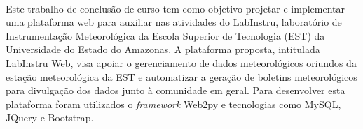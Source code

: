 \ \ \\[2cm]
Este trabalho de conclusão de curso tem como objetivo projetar e implementar uma plataforma web para auxiliar nas atividades do LabInstru, laboratório de Instrumentação Meteorológica da Escola Superior de Tecnologia (EST) da Universidade do Estado do Amazonas. A plataforma proposta, intitulada LabInstru Web, visa apoiar o gerenciamento de dados meteorológicos oriundos da estação meteorológica da EST e automatizar a geração de boletins meteorológicos para divulgação dos dados junto à comunidade em geral. Para desenvolver esta plataforma foram utilizados o \emph{framework} Web2py e tecnologias como MySQL, JQuery e Bootstrap.
